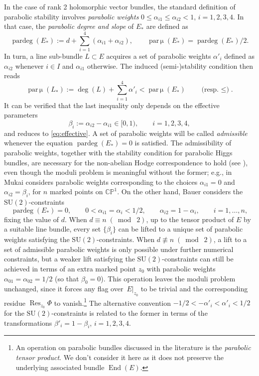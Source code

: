 \documentclass[10pt,a4paper]{amsart}
\newcommand{\field}[1]{\ensuremath{\mathbb{#1}}}
\newcommand{\CC}{\field{C}}
\newcommand{\PP}{\field{P}}
\DeclareMathOperator{\End}{End}
\DeclareMathOperator{\pardeg}{\mathrm{par}\deg}
\DeclareMathOperator{\parmu}{\mathrm{par}\,\mu}
\DeclareMathOperator{\Res}{Res}
\numberwithin{equation}{section}
\begin{document}
\begin{Remark}\label{rem:effective}
In the case of rank 2 holomorphic vector bundles, the standard definition of parabolic stability \cite{MS80,Sim90} involves \emph{parabolic weights} $0\leq \alpha_{i1}\leq\alpha_{i2}<1$, $i=1,2,3,4$. In that case, the \emph{parabolic degree and slope} of $E_{*}$ are defined as
\[
\pardeg(E_{*}) := d + \sum_{i = 1}^{4}(\alpha_{i1}+ \alpha_{i2}),\qquad
\parmu (E_{*}) = \pardeg(E_{*})/2.
\]
In turn, a line sub-bundle $L\subset E$ acquires a set of parabolic weights $\alpha'_{i}$ defined as $\alpha_{i2}$ whenever $i\in I$ and $\alpha_{i1}$ otherwise. The induced (semi-)stability condition then reads
\[
\parmu (L_{*}):=\deg(L)+\sum_{i=1}^{4}\alpha'_{i} < \parmu(E_{*}) \qquad \text{(resp.~$\leq$)}.
\]
It can be verified that the last inequality only depends on the effective parameters
\[
\beta_{i} :=\alpha_{i2}-\alpha_{i1}\in[0,1),\qquad i=1,2,3,4,
\]
and reduces to \eqref{eq:effective}. A set of parabolic weights will be called \emph{admissible} whenever the equation $\pardeg(E_{*})=0$ is satisfied. The admissibility of parabolic weights, together with the stability condition for parabolic Higgs bundles, are necessary for the non-abelian Hodge correspondence to hold (see \cite{Sim90}), even though the moduli problem is meaningful without the former; e.g., in~\cite{Muk03} Mukai considers parabolic weights corresponding to the choices $\alpha_{i1}=0$ and $\alpha_{i2}=\beta_{i}$, for $n$ marked points on $\CC\PP^{1}$. On the other hand, Bauer \cite{Bau91} considers the $\mathrm{SU}(2)$-constraints
\[
\pardeg(E_{*})=0,\qquad 0<\alpha_{i1}=\alpha_{i}< 1/2,\qquad \alpha_{i2} = 1-\alpha_{i},\qquad i=1,\dots,n,
\]
fixing the value of $d$. When $d \equiv n\; (\bmod\; 2)$, up to the tensor product of $E$ by a suitable line bundle, every set $\{\beta_{i}\}$ can be lifted to a unique set of parabolic weights satisfying the $\mathrm{SU}(2)$-constraints. When $d \not\equiv n\; (\bmod\; 2)$, a lift to a set of admissible parabolic weights is only possible under further numerical constraints, but a weaker lift satisfying the $\mathrm{SU}(2)$-constraints can still be achieved in terms of an extra marked point $z_{0}$ with parabolic weights $\alpha_{01}=\alpha_{02}=1/2$ (so that $\beta_{0}=0$). This operation leaves the moduli problem unchanged, since it forces any flag over~$E|_{z_{0}}$ to be trivial and the corresponding residue $\Res_{z_{0}}\Phi$ to vanish.\footnote{An operation on parabolic bundles discussed in the literature is the \emph{parabolic tensor product}. We don't consider it here as it does not preserve the underlying associated bundle $\End (E)$.}
The alternative convention $-1/2<-\alpha'_{i}< \alpha'_{i}< 1/2$ for the $\mathrm{SU}(2)$-constraints is related to the former in terms of the transformations $\beta'_{i}= 1-\beta_{i}$, $i=1,2,3,4$.
\end{Remark}
\end{document}
